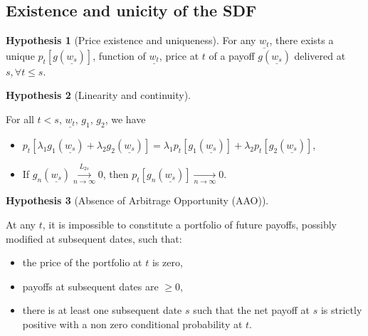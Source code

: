 \documentclass[
  12pt,
]{book}
\providecommand{\tightlist}{%
  \setlength{\itemsep}{0pt}\setlength{\parskip}{0pt}}
\theoremstyle{definition}
\theoremstyle{definition}
\theoremstyle{definition}
\theoremstyle{definition}
\newtheorem{hypothesis}{Hypothesis}[chapter]
\theoremstyle{remark}
\begin{document}
\hypertarget{existence-and-unicity-of-the-sdf}{%
\subsection{Existence and unicity of the SDF}\label{existence-and-unicity-of-the-sdf}}

\begin{hypothesis}[Price existence and uniqueness]
\protect\hypertarget{hyp:Apricing1}{}\label{hyp:Apricing1}For any \(\underline{w_t}\), there exists a unique \(p_t[g(\underline{w_s})]\),
function of \(\underline{w_t}\), price at \(t\) of a payoff
\(g(\underline{w_s})\) delivered at \(s, \forall t \le s\).
\end{hypothesis}

\begin{hypothesis}[Linearity and continuity]
\protect\hypertarget{hyp:Apricing2}{}\label{hyp:Apricing2}

For all \(t < s\), \(\underline{w_t}\), \(g_1\), \(g_2\), we have

\begin{itemize}
\tightlist
\item
  \(p_t[\lambda_1 g_1(\underline{w_s}) + \lambda_2g_2(\underline{w_s})] = \lambda_1p_t[g_1(\underline{w_s})]+\lambda_2 p_t[g_2(\underline{w_s})]\),
\item
  If \(g_n(\underline{w_s}) \overset{L_{2s}}{\underset{n\rightarrow\infty}{\longrightarrow}} 0\), then \(p_t[g_n(\underline{w_s})] \underset{n\rightarrow\infty}{\longrightarrow} 0\).
\end{itemize}

\end{hypothesis}

\begin{hypothesis}[Absence of Arbitrage Opportunity (AAO)]
\protect\hypertarget{hyp:Apricing3}{}\label{hyp:Apricing3}

At any \(t\), it is impossible to constitute a portfolio of future payoffs, possibly modified at subsequent dates, such that:

\begin{itemize}
\tightlist
\item
  the price of the portfolio at \(t\) is zero,
\item
  payoffs at subsequent dates are \(\ge 0\),
\item
  there is at least one subsequent date \(s\) such that the net payoff at \(s\) is strictly positive with a non zero conditional probability at \(t\).
\end{itemize}

\end{hypothesis}
\end{document}
